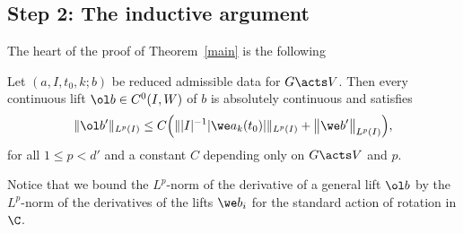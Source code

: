 \subsection*{Step 2: The inductive argument}

The heart of the proof of Theorem~\ref{main} is the following


\begin{Proposition} \label{induction}
 Let $(a, I, t_0, k; b)$ be reduced admissible data for $G \acts V$.
 Then every con\-ti\-nuous lift $\ol b \in C^0(I,W)$ of $b$ is absolutely con\-ti\-nuous and satisfies
 \begin{gather} \label{muab}
 \|\ol b'\|_{L^p(I)} \le C \Big( \| |I|^{-1} {|\we a_k(t_0)|} \|_{L^p (I)}
 + \big\|\we b'\big\|_{L^p (I)}\Big),
 \end{gather}
 for all $1 \le p < d'$ and a constant $C$ depending only on $G \acts V$ and $p$.
\end{Proposition}




\begin{Remark}
 Notice that we bound the $L^p$-norm of the derivative of a general lift $\ol b$
 by the $L^p$-norm of the derivatives of the lifts $\we b_i$ for the standard action of rotation in $\C$.
\end{Remark}



